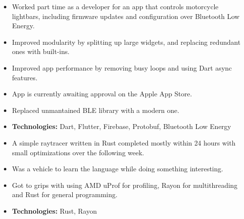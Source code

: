 \documentclass[10pt,a4paper,ragged2e,academicons]{altacv}
\begin{document}


\makecvheader


\begin{paracol}{2}


  \begin{itemize}
    \item Worked part time as a developer for an app that controls motorcycle lightbars, including firmware updates and configuration over Bluetooth Low Energy.
    \item Improved modularity by splitting up large widgets, and replacing redundant ones with built-ins.
    \item Improved app performance by removing busy loops and using Dart async features.
    \item App is currently awaiting approval on the Apple App Store.
    \item Replaced unmantained BLE library with a modern one.
    \item \textbf{Technologies:} Dart, Flutter, Firebase, Protobuf, Bluetooth Low Energy
  \end{itemize}
  \divider\small

  \begin{itemize}
    \item A simple raytracer written in Rust completed mostly within 24 hours with small optimizations over the following week.
    \item Was a vehicle to learn the language while doing something interesting.
    \item Got to grips with using AMD uProf for profiling, Rayon for multithreading and Rust for general programming.
    \item \textbf{Technologies:} Rust, Rayon
  \end{itemize}
  \divider\small


\end{paracol}
\end{document}
